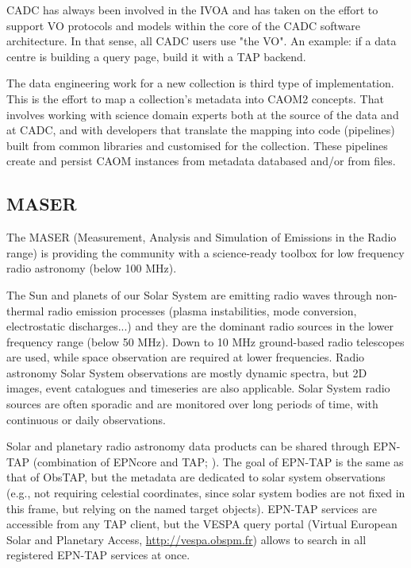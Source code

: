\documentclass[11pt,a4paper]{ivoa}
\begin{document}
CADC has always been involved in the IVOA and has taken on the effort to support VO protocols and models 
within the core of the CADC software architecture. In that sense, all CADC users use "the VO".  An 
example: if a data centre is building a query page, build it with a TAP backend.

The data engineering work for a new collection is third type of implementation. This is the effort to 
map a collection's metadata into CAOM2 concepts. That involves working with science domain experts both 
at the source of the data and at CADC, and with developers that translate the mapping into code 
(pipelines) built from common libraries and customised for the collection. These pipelines create and 
persist CAOM instances from metadata databased and/or from files.

\subsection{MASER}
\label{sec:maser}

The MASER (Measurement, Analysis and Simulation of Emissions in the Radio range) is providing the 
community with a science-ready toolbox for low frequency radio astronomy (below 100 MHz). 

The Sun and planets of our Solar System are emitting radio waves through non-thermal radio emission 
processes (plasma instabilities, mode conversion, electrostatic discharges...) and they are the dominant 
radio sources in the lower frequency range (below 50 MHz). Down to 10 MHz ground-based radio telescopes
are used, while space observation are required at lower frequencies. Radio astronomy Solar System 
observations are mostly dynamic spectra, but 2D images, event catalogues and timeseries are also 
applicable. Solar System radio sources are often sporadic and are monitored over long periods of time, 
with continuous or daily observations. 

Solar and planetary radio astronomy data products can be shared through EPN-TAP (combination of EPNcore 
and TAP; \cite{std:EPNTAP}). The goal of EPN-TAP is the same as that of ObsTAP, but the metadata are 
dedicated to solar system observations (e.g., not requiring celestial coordinates, since solar system 
bodies are not fixed in this frame, but relying on the named target objects). EPN-TAP services are 
accessible from any TAP client, but the VESPA query portal (Virtual European Solar and Planetary Access, 
\url{http://vespa.obspm.fr}) allows to search in all registered EPN-TAP services at once.
\end{document}
